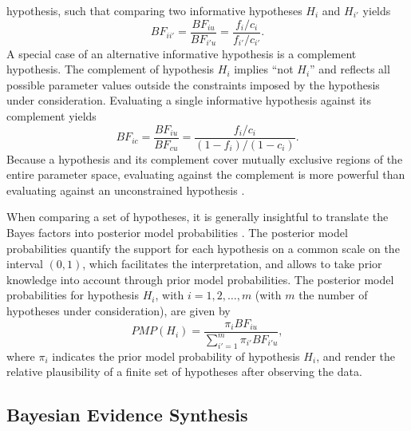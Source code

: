 \documentclass[
]{article}
\begin{document}
hypothesis, such that comparing two informative hypotheses \(H_i\) and
\(H_{i'}\) yields \[
BF_{ii'} = \frac{BF_{iu}}{BF_{i'u}} = \frac{f_i / c_i}{f_{i'}/c_{i'}}.
\] A special case of an alternative informative hypothesis is a
complement hypothesis. The complement of hypothesis \(H_i\) implies
``not \(H_i\)'' and reflects all possible parameter values outside the
constraints imposed by the hypothesis under consideration. Evaluating a
single informative hypothesis against its complement yields \[
BF_{i c} = \frac{BF_{iu}}{BF_{cu}} = \frac{f_i/c_i}{(1 - f_i) / (1 - c_i)}.
\] Because a hypothesis and its complement cover mutually exclusive
regions of the entire parameter space, evaluating against the complement
is more powerful than evaluating against an unconstrained hypothesis
\citep{klugkist_volker_2023}.

When comparing a set of hypotheses, it is generally insightful to
translate the Bayes factors into posterior model probabilities
\citep[\(PMP\)s;][]{kass_raftery_bayes_factors_1995}. The posterior
model probabilities quantify the support for each hypothesis on a common
scale on the interval \((0,1)\), which facilitates the interpretation,
and allows to take prior knowledge into account through prior model
probabilities. The posterior model probabilities for hypothesis \(H_i\),
with \(i = 1, 2, \dots, m\) (with \(m\) the number of hypotheses under
consideration), are given by \[
PMP(H_{i}) = \frac{\pi_i BF_{iu}}{\sum^m_{i'=1} \pi_{i'} BF_{i'u}}, 
\] where \(\pi_i\) indicates the prior model probability of hypothesis
\(H_i\), and render the relative plausibility of a finite set of
hypotheses after observing the data.

\hypertarget{bayesian-evidence-synthesis}{%
\subsection{Bayesian Evidence
Synthesis}\label{bayesian-evidence-synthesis}}
\end{document}
